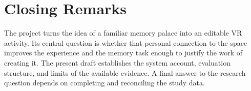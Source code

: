 \section{Closing Remarks}
The project turns the idea of a familiar memory palace into an editable VR activity. Its central question is whether that personal connection to the space improves the experience and the memory task enough to justify the work of creating it. The present draft establishes the system account, evaluation structure, and limits of the available evidence. A final answer to the research question depends on completing and reconciling the study data.

